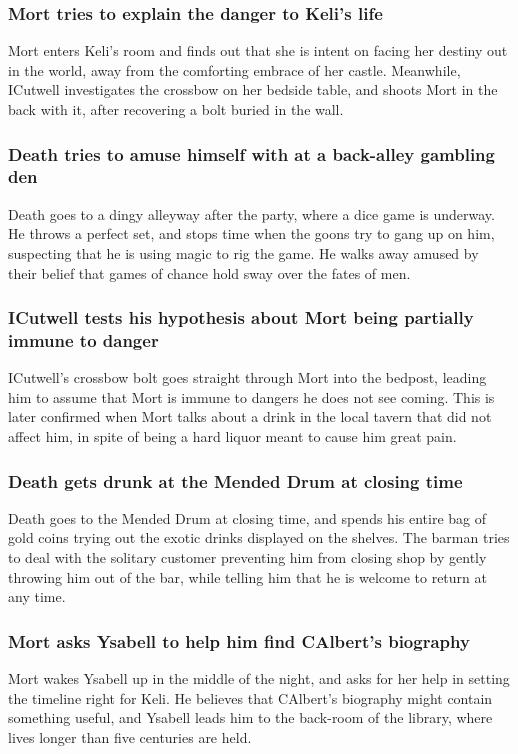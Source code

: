 \subsubsection{\Gls{Mort} tries to explain the danger to \Gls{Keli}'s life}
\Gls{Mort} enters \Gls{Keli}'s room and finds out that she is intent on facing her destiny out in
the world, away from the comforting embrace of her castle. Meanwhile, \Gls{ICutwell} investigates
the crossbow on her bedside table, and shoots \Gls{Mort} in the back with it, after recovering a
bolt buried in the wall.

\subsubsection{\Gls{Death} tries to amuse himself with at a back-alley gambling den}
\Gls{Death} goes to a dingy alleyway after the party, where a dice game is underway. He throws a
perfect set, and stops time when the goons try to gang up on him, suspecting that he is using
magic to rig the game. He walks away amused by their belief that games of chance hold sway over the
fates of men.

\subsubsection{\Gls{ICutwell} tests his hypothesis about \Gls{Mort} being partially immune to
    danger}
\Gls{ICutwell}'s crossbow bolt goes straight through \Gls{Mort} into the bedpost, leading him to
assume that \Gls{Mort} is immune to dangers he does not see coming. This is later confirmed when
\Gls{Mort} talks about a drink in the local tavern that did not affect him, in spite of being a
hard liquor meant to cause him great pain.

\subsubsection{\Gls{Death} gets drunk at the Mended Drum at closing time}
\Gls{Death} goes to the Mended Drum at closing time, and spends his entire bag of gold coins trying
out the exotic drinks displayed on the shelves. The barman tries to deal with the solitary customer
preventing him from closing shop by gently throwing him out of the bar, while telling him that he
is welcome to return at any time.

\subsubsection{\Gls{Mort} asks \Gls{Ysabell} to help him find \Gls{CAlbert}'s biography}
\Gls{Mort} wakes \Gls{Ysabell} up in the middle of the night, and asks for her help in setting the
timeline right for \Gls{Keli}. He believes that \Gls{CAlbert}'s biography might contain something
useful, and \Gls{Ysabell} leads him to the back-room of the library, where lives longer than five
centuries are held.

